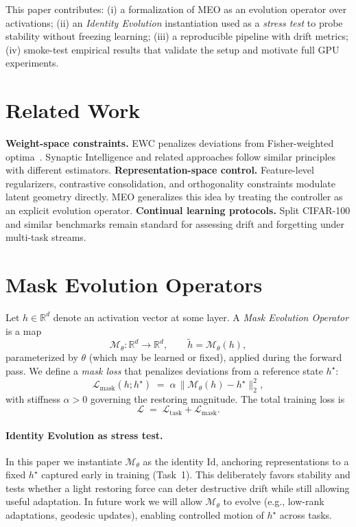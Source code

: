 \documentclass[11pt]{article}
\newcommand{\EWC}{\textsc{EWC}}
\newcommand{\MEO}{\textsc{MEO}}
\newcommand{\Id}{\mathrm{Id}}
\newcommand{\R}{\mathbb{R}}
\begin{document}
This paper contributes: (i) a formalization of \MEO{} as an evolution operator over activations; (ii) an \emph{Identity Evolution} instantiation used as a \emph{stress test} to probe stability without freezing learning; (iii) a reproducible pipeline with drift metrics; (iv) smoke-test empirical results that validate the setup and motivate full GPU experiments.

\section{Related Work}
\textbf{Weight-space constraints.} \EWC{} penalizes deviations from Fisher-weighted optima~\cite{kirkpatrick2017overcoming}. Synaptic Intelligence and related approaches follow similar principles with different estimators. 
\textbf{Representation-space control.} Feature-level regularizers, contrastive consolidation, and orthogonality constraints modulate latent geometry directly. \MEO{} generalizes this idea by treating the controller as an explicit evolution operator. 
\textbf{Continual learning protocols.} Split CIFAR-100 and similar benchmarks remain standard for assessing drift and forgetting under multi-task streams.

\section{Mask Evolution Operators}
Let $h \in \R^d$ denote an activation vector at some layer. A \emph{Mask Evolution Operator} is a map
\begin{equation}
  \mathcal{M}_\theta: \R^d \to \R^d, \qquad \tilde{h} = \mathcal{M}_\theta(h),
\end{equation}
parameterized by $\theta$ (which may be learned or fixed), applied during the forward pass. We define a \emph{mask loss} that penalizes deviations from a reference state $h^\star$:
\begin{equation}
  \mathcal{L}_{\mathrm{mask}}(h; h^\star) \;=\; \alpha\,\| \mathcal{M}_\theta(h) - h^\star\|_2^2,
\end{equation}
with stiffness $\alpha \!>\! 0$ governing the restoring magnitude. The total training loss is
\begin{equation}
  \mathcal{L} \;=\; \mathcal{L}_{\mathrm{task}} + \mathcal{L}_{\mathrm{mask}}.
\end{equation}

\paragraph{Identity Evolution as stress test.}
In this paper we instantiate $\mathcal{M}_\theta$ as the identity $\Id$, anchoring representations to a fixed $h^\star$ captured early in training (Task~1). This deliberately favors stability and tests whether a light restoring force can deter destructive drift while still allowing useful adaptation. In future work we will allow $\mathcal{M}_\theta$ to evolve (e.g., low-rank adaptations, geodesic updates), enabling controlled motion of $h^\star$ across tasks.
\end{document}
